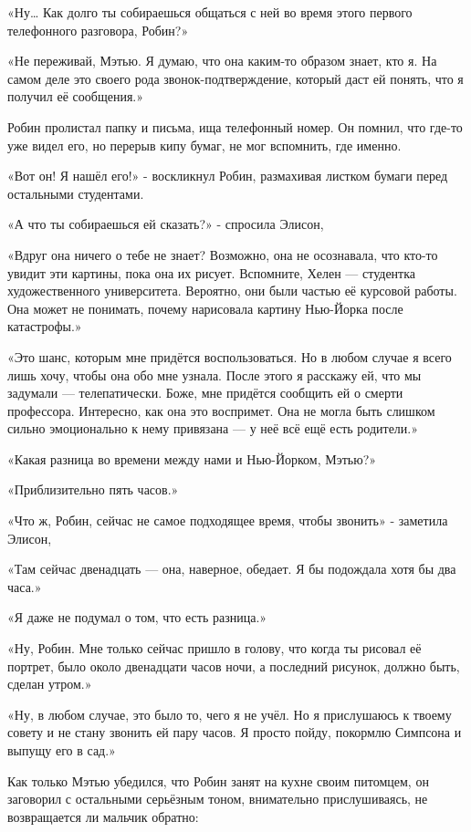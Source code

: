 \documentclass[a5paper, 9pt,
final, openany, twoside=true]{memoir}
\begin{document}
«Ну… Как долго ты собираешься общаться с ней во время этого первого телефонного разговора, Робин?»

«Не переживай, Мэтью. Я думаю, что она каким-то образом знает, кто я. На самом деле это своего рода звонок-подтверждение, который даст ей понять, что я получил её сообщения.»

Робин пролистал папку и письма, ища телефонный номер. Он помнил, что где-то уже видел его, но перерыв кипу бумаг, не мог вспомнить, где именно.

«Вот он! Я нашёл его!» - воскликнул Робин, размахивая листком бумаги перед остальными студентами.

«А что ты собираешься ей сказать?» - спросила Элисон,

«Вдруг она ничего о тебе не знает? Возможно, она не осознавала, что кто-то увидит эти картины, пока она их рисует. Вспомните, Хелен — студентка художественного университета. Вероятно, они были частью её курсовой работы. Она может не понимать, почему нарисовала картину Нью-Йорка после катастрофы.»

«Это шанс, которым мне придётся воспользоваться. Но в любом случае я всего лишь хочу, чтобы она обо мне узнала. После этого я расскажу ей, что мы задумали — телепатически. Боже, мне придётся сообщить ей о смерти профессора. Интересно, как она это воспримет. Она не могла быть слишком сильно эмоционально к нему привязана — у неё всё ещё есть родители.»

«Какая разница во времени между нами и Нью-Йорком, Мэтью?»

«Приблизительно пять часов.»

«Что ж, Робин, сейчас не самое подходящее время, чтобы звонить» - заметила Элисон,

«Там сейчас двенадцать — она, наверное, обедает. Я бы подождала хотя бы два часа.»

«Я даже не подумал о том, что есть разница.»

«Ну, Робин. Мне только сейчас пришло в голову, что когда ты рисовал её портрет, было около двенадцати часов ночи, а последний рисунок, должно быть, сделан утром.»

«Ну, в любом случае, это было то, чего я не учёл. Но я прислушаюсь к твоему совету и не стану звонить ей пару часов. Я просто пойду, покормлю Симпсона и выпущу его в сад.»\bigskip

Как только Мэтью убедился, что Робин занят на кухне своим питомцем, он заговорил с остальными серьёзным тоном, внимательно прислушиваясь, не возвращается ли мальчик обратно:
\end{document}
